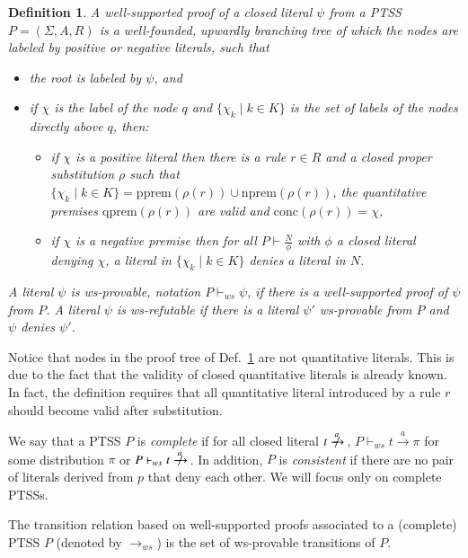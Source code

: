 \documentclass[submission,copyright,creativecommons]{eptcs}
\newtheorem{definition}{Definition}
\newcommand{\dedrule}[2]{\frac{#1}{#2}}
\newcommand{\trans}[1][]{\xrightarrow{\, {#1} \, }}
\newcommand{\ntrans}[1][]{\mathrel{{\trans[#1]}\makebox[0em][r]{$\not$\hspace{2ex}}}{\!}}
\newcommand{\pprem}[1]{\textrm{pprem}(#1)}
\newcommand{\nprem}[1]{\textrm{nprem}(#1)}
\newcommand{\qprem}[1]{\textrm{qprem}(#1)}
\newcommand{\conc}[1]{\textrm{conc}(#1)}
\newcommand{\Act}{A}
\newcommand{\colorpar}[3]{\colorbox{#1}{\parbox{#2}{#3}}}
\newcommand{\marginremark}[3]{\marginpar{\colorpar{#2}{\linewidth}{\color{#1}#3}}}
\newcommand{\remarkPRD}[1]{\marginremark{darkred}{lightred}{\tiny{[PRD]~ #1}}}
\newcommand{\remarkDG}[1]{\marginremark{darkgreen}{lightyellow}{\tiny{[DG]~ #1}}}
\newcommand{\wsproves}{\vdash_{\textit{ws}}}
\renewcommand{\remarkDG}[1]{}
\renewcommand{\remarkPRD}[1]{}
\begin{document}
\begin{definition}
 \label{def:ws-proof}
 A \emph{well-supported proof} of a closed literal $\psi$ from a PTSS
 $P = (\Sigma, \Act, R)$ is a well-founded, upwardly branching tree of which the nodes
 are labeled by positive or negative literals, such that
\begin{itemize}
 \item the root is labeled by $\psi$, and 
 \item if $\chi$ is the label of the node $q$ and $\{\chi_k \mid k \in K\}$ is the set of labels of 
  the nodes directly above $q$, then:
\begin{itemize}
 \item if $\chi$ is a positive literal then there is a rule $r \in R$ and a closed proper substitution $\rho$ such that 
          $\{\chi_k \mid k \in K\}=\pprem{\rho(r)}\cup\nprem{\rho(r)}$, the quantitative premises $\qprem{\rho(r)}$ are valid and  
          $\conc{\rho(r)} = \chi$,
\item if $\chi$ is a negative premise then for all $P \vdash \dedrule{N}{\phi}$ with $\phi$ a closed literal denying $\chi$, a 
       literal in $\{\chi_k \mid k \in K\}$ denies a literal in $N$.
\end{itemize}
\end{itemize}
A literal $\psi$ is \emph{ws-provable}, notation $P \wsproves \psi$, if there is a well-supported proof of
$\psi$ from $P$. A literal $\psi$ is \emph{ws-refutable} if there is a literal $\psi'$ ws-provable from $P$ and $\psi$ denies $\psi'$.
\end{definition}

Notice that nodes in the proof tree of Def.~\ref{def:ws-proof} are not
quantitative literals.  This is due to the fact that the validity of
closed quantitative literals is already known.  In fact, the
definition requires that all quantitative literal introduced by a rule
$r$ should become valid after substitution.



We say that a PTSS $P$ is \emph{complete} if for all closed literal $t \ntrans[a]$, $P \vdash_{ws} t\trans[a] \pi$ for some distribution $\pi$ or $P \vdash_{ws} t\ntrans[a]$.
In addition, $P$ is \emph{consistent} if there are no pair of literals
derived from $p$ that deny each other.
We will focus only on complete PTSSs. 
\remarkDG{Main theorem does not require completeness, so for which part and why is completeness required?}
\remarkPRD{You are right and I thought of it, but since we are defining in this paper the concept of a model based on well-supported proof maybe it is ok to keep it.  Anyway I am not really aiming to push this.  If space is needed, this would be a candidate to remove}
The transition relation based on well-supported proofs associated to 
a (complete) PTSS $P$ (denoted by ${\trans_{ws}}$) is the set of ws-provable transitions
of $P$.
\end{document}

